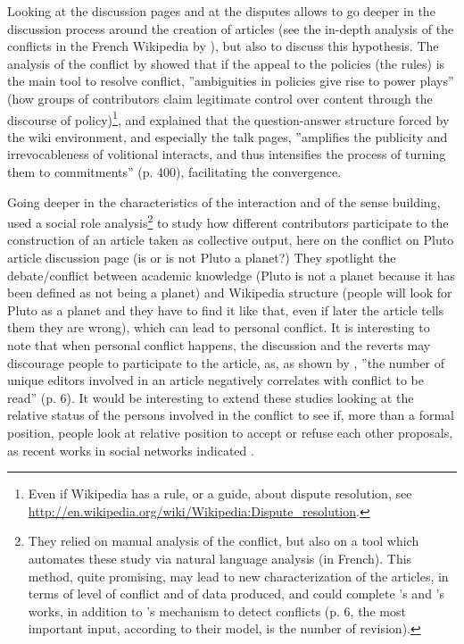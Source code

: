 Looking at the discussion pages and at the disputes allows to go deeper
in the discussion process around the creation of articles (see the
in-depth analysis of the conflicts in the French Wikipedia by \citealt{Aurayetal09}),
but also to discuss this hypothesis. The analysis of the conflict
by \citet{Kripleanetal07} showed that if the appeal to the policies
(the rules) is the main tool to resolve conflict, ''ambiguities in
policies give rise to power plays'' (how groups of contributors claim
legitimate control over content through the discourse of policy)\footnote{Even if Wikipedia has a rule, or a guide, about dispute resolution,
see \url{http://en.wikipedia.org/wiki/Wikipedia:Dispute_resolution}.}, and \citet{Nagar12} explained that the question-answer structure
forced by the wiki environment, and especially the talk pages, ''amplifies
the publicity and irrevocableness of volitional interacts, and thus
intensifies the process of turning them to commitments'' (p. 400),
facilitating the convergence.

Going deeper in the characteristics of the interaction and of the
sense building, \citet{Freardetal10} used a social role analysis\footnote{They relied on manual analysis of the conflict, but also on a tool
which automates these study via natural language analysis (in French).
This method, quite promising, may lead to new characterization of
the articles, in terms of level of conflict and of data produced,
and could complete \citet{FongBiuk-Aghai10}'s and \citet{ViegasWattenbergDave04}'s
works, in addition to \citeauthor{Kitturetal07a}'s mechanism to detect
conflicts (p. 6, the most important input, according to their model,
is the number of revision).} to study how different contributors participate to the construction
of an article taken as collective output, here on the conflict on
Pluto article discussion page (is or is not Pluto a planet?) They
spotlight the debate/conflict between academic knowledge (Pluto is
not a planet because it has been defined as not being a planet) and
Wikipedia structure (people will look for Pluto as a planet and they
have to find it like that, even if later the article tells them they
are wrong), which can lead to personal conflict. It is interesting
to note that when personal conflict happens, the discussion and the
reverts may discourage people to participate to the article, as, as
shown by \citet{Kitturetal07a}, ''the number of unique editors involved
in an article negatively correlates with conflict to be read'' (p.
6). It would be interesting to extend these studies looking at the
relative status of the persons involved in the conflict to see if,
more than a formal position, people look at relative position to accept
or refuse each other proposals, as recent works in social networks
indicated \citep{Burt09,LeskovecHuttenlocherKleinberg10b}.


